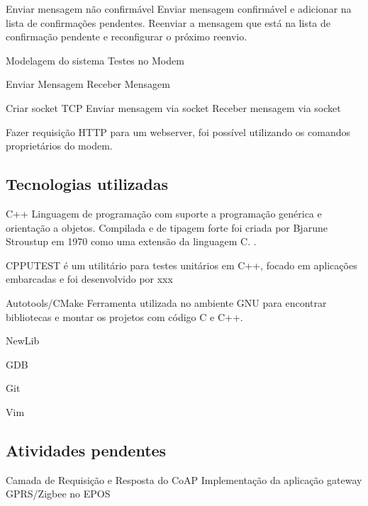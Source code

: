 Enviar mensagem n\~ao confirm\'avel
Enviar mensagem confirm\'avel e adicionar na lista de confirma\c{c}\~oes pendentes.
Reenviar a mensagem que est\'a na lista de confirma\c{c}\~ao pendente e reconfigurar o pr\'oximo reenvio.

Modelagem do sistema
Testes no Modem

Enviar Mensagem
Receber Mensagem

Criar socket TCP
Enviar mensagem via socket
Receber mensagem via socket

Fazer requisi\c{c}\~ao HTTP para um webserver, foi poss\'ivel utilizando os comandos propriet\'arios do modem.


\subsection{Tecnologias utilizadas}
C++
Linguagem de programa\c{c}\~ao com suporte a programa\c{c}\~ao gen\'erica e orienta\c{c}\~ao a objetos.
Compilada e de tipagem forte foi criada por Bjarune Stroustup em 1970 como uma extens\~ao da linguagem C. \cite{Stroustrup95thec++}.


CPPUTEST
\'e um utilit\'ario para testes unit\'arios em C++, focado em aplica\c{c}\~oes embarcadas e foi desenvolvido por xxx

Autotools/CMake
Ferramenta utilizada no ambiente GNU para encontrar bibliotecas e montar os projetos com c\'odigo C e C++.

NewLib

GDB

Git

Vim

\subsection{Atividades pendentes}
Camada de Requisi\c{c}\~ao e Resposta do CoAP
Implementa\c{c}\~ao da aplica\c{c}\~ao gateway GPRS/Zigbee no EPOS
